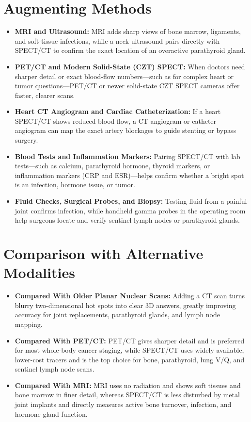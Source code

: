 \section{Augmenting Methods}
\begin{itemize}
    \item \textbf{MRI and Ultrasound:} MRI adds sharp views of bone marrow, ligaments, and soft-tissue infections, while a neck ultrasound pairs directly with SPECT/CT to confirm the exact location of an overactive parathyroid gland.
    \item \textbf{PET/CT and Modern Solid-State (CZT) SPECT:} When doctors need sharper detail or exact blood-flow numbers---such as for complex heart or tumor questions---PET/CT or newer solid-state CZT SPECT cameras offer faster, clearer scans.
    \item \textbf{Heart CT Angiogram and Cardiac Catheterization:} If a heart SPECT/CT shows reduced blood flow, a CT angiogram or catheter angiogram can map the exact artery blockages to guide stenting or bypass surgery.
    \item \textbf{Blood Tests and Inflammation Markers:} Pairing SPECT/CT with lab tests---such as calcium, parathyroid hormone, thyroid markers, or inflammation markers (CRP and ESR)---helps confirm whether a bright spot is an infection, hormone issue, or tumor.
    \item \textbf{Fluid Checks, Surgical Probes, and Biopsy:} Testing fluid from a painful joint confirms infection, while handheld gamma probes in the operating room help surgeons locate and verify sentinel lymph nodes or parathyroid glands.
\end{itemize}

\section{Comparison with Alternative Modalities}
\begin{itemize}
    \item \textbf{Compared With Older Planar Nuclear Scans:} Adding a CT scan turns blurry two-dimensional hot spots into clear 3D answers, greatly improving accuracy for joint replacements, parathyroid glands, and lymph node mapping.
    \item \textbf{Compared With PET/CT:} PET/CT gives sharper detail and is preferred for most whole-body cancer staging, while SPECT/CT uses widely available, lower-cost tracers and is the top choice for bone, parathyroid, lung V/Q, and sentinel lymph node scans.
    \item \textbf{Compared With MRI:} MRI uses no radiation and shows soft tissues and bone marrow in finer detail, whereas SPECT/CT is less disturbed by metal joint implants and directly measures active bone turnover, infection, and hormone gland function.
\end{itemize}


